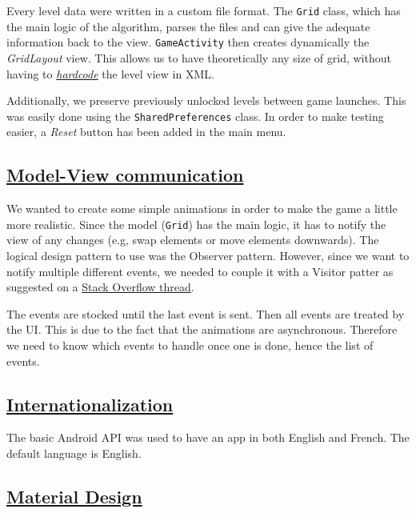 \documentclass{article}
\begin{document}
Every level data were written in a custom file format. The \texttt{Grid} class, which has the main logic of the algorithm, parses the files and can give the adequate information back to the view. \texttt{GameActivity} then creates dynamically the \textit{GridLayout} view. This allows us to have theoretically any size of grid, without having to \href{http://tclhost.com/f7IaLC9.gif}{\textit{hardcode}} the level view in XML.

Additionally, we preserve previously unlocked levels between game launches. This was easily done using the \texttt{SharedPreferences} class. In order to make testing easier, a \textit{Reset} button has been added in the main menu.

\subsection{\href{https://collegecandy.files.wordpress.com/2016/11/48e3110b48be34105f10b2114adaf860bf2a0f18.gif?w=750}{Model-View communication}}

We wanted to create some simple animations in order to make the game a little more realistic. Since the model (\texttt{Grid}) has the main logic, it has to notify the view of any changes (e.g, swap elements or move elements downwards). The logical design pattern to use was the Observer pattern. However, since we want to notify multiple different events, we needed to couple it with a Visitor patter as suggested on a \href{http://stackoverflow.com/a/6608600/5795409}{Stack Overflow thread}.

The events are stocked until the last event is sent. Then all events are treated by the UI. This is due to the fact that the animations are asynchronous. Therefore we need to know which events to handle once one is done, hence the list of events.

\subsection{\href{https://media.giphy.com/media/bGvS8e3N9sh5S/giphy.gif}{Internationalization}}

The basic Android API was used to have an app in both English and French. The default language is English.

\subsection{\href{https://media.tenor.co/images/131a172b8a349afd711cd7de7ab1177a/raw}{Material Design}}
\end{document}
